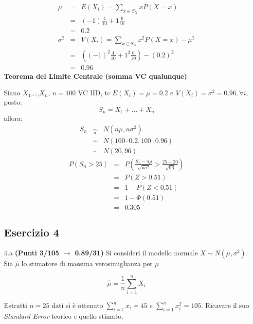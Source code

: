 \documentclass[
  11pt,
]{book}
\theoremstyle{mytheoremstyle}
\theoremstyle{mydefstyle}
\newenvironment{sol}
  {
  \begin{tcolorbox}[enhanced,breakable,arc=0.1mm,boxrule=1pt,colback=white,colframe=iblue,
  title=\bf \fontfamily{lmss}\selectfont \hspace{.5 cm} Soluzione,drop fuzzy shadow]

}{
\end{tcolorbox}
  }
\begin{document}
\begin{sol}
\begin{eqnarray*} \mu &=& E(X_i) = \sum_{x\in S_X}x P(X=x)\\ 
 &=& ( -1 ) \frac { 4 }{ 10 }+ 1  \frac { 6 }{ 10 } \\ 
            &=& 0.2 \\ 
 \sigma^2 &=& V(X_i) = \sum_{x\in S_X}x^2 P(X=x)-\mu^2\\ 
 &=&\left( ( -1 ) ^2\frac { 4 }{ 10 }+ 1  ^2\frac { 6 }{ 10 } \right)-( 0.2 )^2\\ 
            &=& 0.96 
\end{eqnarray*}
\textbf{Teorema del Limite Centrale (somma VC qualunque)}

Siano \(X_1\),\ldots,\(X_n\), \(n=100\) VC IID, tc \(E(X_i)=\mu=0.2\) e \(V(X_i)=\sigma^2=0.96,\forall i\), posto:
\[
      S_n = X_1 + ... + X_n
      \]
allora:\begin{eqnarray*}
  S_n & \mathop{\sim}\limits_{a}& N(n\mu,n\sigma^2) \\
     &\sim & N(100\cdot0.2,100\cdot0.96) \\
     &\sim & N(20,96) 
  \end{eqnarray*}\begin{eqnarray*}
      P( S_n   >   25 ) 
        &=& P\left(  \frac { S_n  -  n\mu }{ \sqrt{n\sigma^2} }  >  \frac { 25  -  20 }{\sqrt{ 96 }} \right)  \\
                 &=& P\left(  Z   >   0.51 \right) \\    &=& 1-P(Z< 0.51 )\\ 
                 &=&  1-\Phi( 0.51 ) \\ &=&  0.305 
      \end{eqnarray*}

\end{sol}

\subsection{Esercizio 4}\label{esercizio-4-40}

4.a \textbf{(Punti 3/105 \(\rightarrow\) 0.89/31)} Si consideri il modello normale \(X\sim N(\mu,\sigma^2)\). Sia \(\hat\mu\) lo stimatore di massima verosimiglianza per \(\mu\)

\[
  \hat\mu = \frac 1n \sum_{i=1}^n X_i
\]

Estratti \(n=25\) dati si è ottenuto \(\sum_{i=1}^n x_i = 45\) e \(\sum_{i=1}^n x_i^2 = 105\). Ricavare il suo \emph{Standard Error} teorico e quello stimato.
\end{document}

